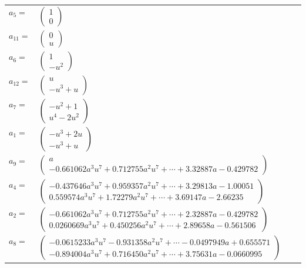 \documentclass[1p]{elsarticle_modified}
\theoremstyle{definition}
\begin{document}
\begin{tabular}{m{7pt} m{180pt} m{7pt} m{180pt} }
\flushright $a_{5}=$&$\begin{pmatrix}1\\0\end{pmatrix}$ \\
\flushright $a_{11}=$&$\begin{pmatrix}0\\u\end{pmatrix}$ \\
\flushright $a_{6}=$&$\begin{pmatrix}1\\- u^2\end{pmatrix}$ \\
\flushright $a_{12}=$&$\begin{pmatrix}u\\- u^3+u\end{pmatrix}$ \\
\flushright $a_{7}=$&$\begin{pmatrix}- u^2+1\\u^4-2 u^2\end{pmatrix}$ \\
\flushright $a_{1}=$&$\begin{pmatrix}- u^3+2 u\\- u^3+u\end{pmatrix}$ \\
\flushright $a_{9}=$&$\begin{pmatrix}a\\-0.661062 a^{3} u^{7}+0.712755 a^{2} u^{7}+\cdots+3.32887 a-0.429782\end{pmatrix}$ \\
\flushright $a_{4}=$&$\begin{pmatrix}-0.437646 a^{3} u^{7}+0.959357 a^{2} u^{7}+\cdots+3.29813 a-1.00051\\0.559574 a^{3} u^{7}+1.72279 a^{2} u^{7}+\cdots+3.69147 a-2.66235\end{pmatrix}$ \\
\flushright $a_{2}=$&$\begin{pmatrix}-0.661062 a^{3} u^{7}+0.712755 a^{2} u^{7}+\cdots+2.32887 a-0.429782\\0.0260669 a^{3} u^{7}+0.450256 a^{2} u^{7}+\cdots+2.89658 a-0.561506\end{pmatrix}$ \\
\flushright $a_{8}=$&$\begin{pmatrix}-0.0615233 a^{3} u^{7}-0.931358 a^{2} u^{7}+\cdots-0.0497949 a+0.655571\\-0.894004 a^{3} u^{7}+0.716450 a^{2} u^{7}+\cdots+3.75631 a-0.0660995\end{pmatrix}$ \\

\end{tabular}
\end{document}
